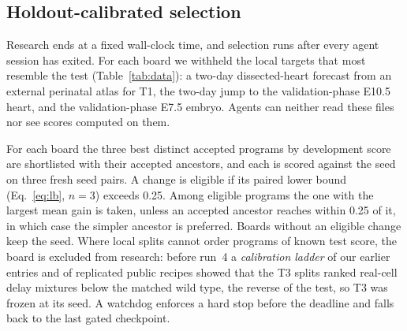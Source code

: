 \documentclass[9pt,twocolumn,a4paper]{extarticle}
\begin{document}
\subsection{Holdout-calibrated selection}
\label{sec:final}

Research ends at a fixed wall-clock time, and selection runs after every agent session has exited. For each board we
withheld the local targets that most resemble the test (Table~\ref{tab:data}): a two-day dissected-heart forecast
from an external perinatal atlas for T1, the two-day jump to the validation-phase E10.5 heart, and the
validation-phase E7.5 embryo. Agents can neither read these files nor see scores computed on them.

For each board the three best distinct accepted programs by development score are shortlisted with their accepted ancestors, and each is scored against the seed on three fresh seed pairs. A change is eligible if its paired lower bound (Eq.~\ref{eq:lb}, $n=3$) exceeds 0.25. Among eligible programs the one with the largest mean gain is taken, unless an accepted ancestor reaches within 0.25 of it, in which case the simpler ancestor is preferred. Boards without an eligible change keep the seed. Where local splits cannot order programs of known test score, the board is excluded from research: before run~4 a \emph{calibration ladder} of our earlier entries and of replicated public recipes showed that the T3 splits ranked real-cell delay mixtures below the matched wild type, the reverse of the test, so T3 was frozen at its seed. A watchdog enforces a hard stop before the deadline and falls back to the last gated checkpoint.
\end{document}
